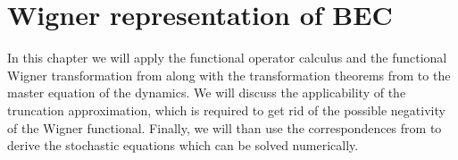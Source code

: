 \chapter{Wigner representation of BEC}
\label{cha:wigner-bec}

In this chapter we will apply the functional operator calculus and the functional Wigner transformation from  along with the transformation theorems from  to the master equation of the  dynamics.
We will discuss the applicability of the truncation approximation, which is required to get rid of the possible negativity of the Wigner functional.
Finally, we will than use the correspondences from  to derive the stochastic equations which can be solved numerically.










